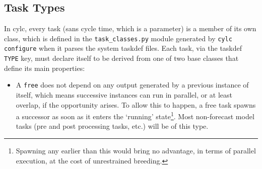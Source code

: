 \documentclass[11pt,a4paper]{article}
\begin{document}
\subsection{Task Types} 

In cylc, every task (sans cycle time, which is a parameter) is a member
of its own class, which is defined in the \lstinline=task_classes.py=
module generated by \lstinline=cylc configure= when it parses the system
taskdef files.  Each task, via the taskdef \lstinline=TYPE= key, must
declare itself to be derived from one of two base classes that define
its main properties:

\begin{itemize} \item A \lstinline=free= does not depend on any
        output generated by a previous instance of itself, which means
        successive instances can run in parallel, or at least overlap,
        if the opportunity arises. To allow this to happen, a free task
        spawns a successor as soon as it enters the `running'
        state\footnote{Spawning any earlier than this would bring no
        advantage, in terms of parallel execution, at the cost of
        unrestrained breeding.}. Most non-forecast model tasks (pre and
        post processing tasks, etc.) will be of this type.


\end{itemize}
\end{document}
